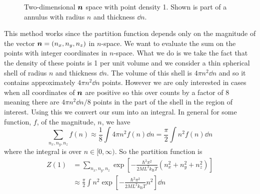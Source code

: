 \documentclass[a4paper]{article}
\newcommand{\boltzmann}{k_\mathrm{B}}
\begin{document}
    \begin{figure}[ht]
        \centering
        \caption{Two-dimensional \(\bm{n}\) space with point density 1. Shown is part of a annulus with radius \(n\) and thickness \(\dd{n}\).}
    \end{figure}
    This method works since the partition function depends only on the magnitude of the vector \(\bm{n} = (n_x, n_y, n_z)\) in \(n\)-space.
    We want to evaluate the sum on the points with integer coordinates in \(n\)-space.
    What we do is we take the fact that the density of these points is 1 per unit volume and we consider a thin spherical shell of radius \(n\) and thickness \(\dd{n}\).
    The volume of this shell is \(4\pi n^2\dd{n}\) and so it contains approximately \(4\pi n^2\dd{n}\) points.
    However we are only interested in cases when all coordinates of \(\bm{n}\) are positive so this over counts by a factor of 8 meaning there are \(4\pi n^2\dd{n}/8\) points in the part of the shell in the region of interest.
    Using this we convert our sum into an integral.
    In general for some function, \(f\), of the magnitude, \(n\), we have
    \[\sum_{n_x, n_y, n_z} f(n) \approx \frac{1}{8}\int 4\pi n^2f(n)\dd{n} = \frac{\pi}{2}\int n^2f(n)\dd{n}\]
    where the integral is over \(n\in[0, \infty)\).
    So the partition function is
    \begin{align*}
        Z(1) &= \sum_{n_x, n_y, n_z} \exp\left[-\frac{\hbar^2\pi^2}{2ML^2\boltzmann T}(n_x^2 + n_y^2 + n_z^2)\right]\\
        &\approx \frac{\pi}{2}\int n^2 \exp\left[-\frac{\hbar^2\pi^2}{2ML^2\boltzmann T}n^2\right] \dd{n}
    \end{align*}
\end{document}

